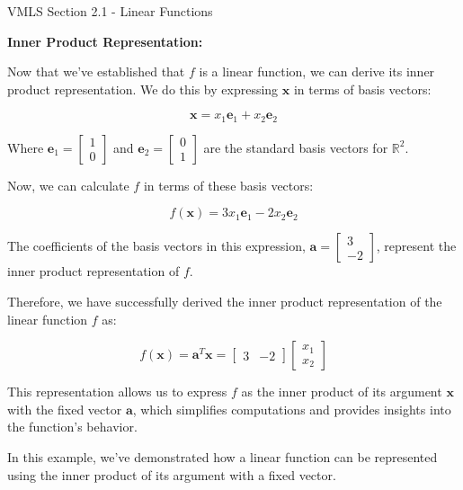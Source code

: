 \begin{notes}{VMLS Section 2.1 - Linear Functions}
\begin{Highlight}
        \vspace*{1em} \textbf{Inner Product Representation:} \vspace*{1em}
        
        Now that we've established that \(f\) is a linear function, we can derive its inner product representation. We do this by expressing \(\mathbf{x}\) in terms of basis vectors:
        
        \[
        \mathbf{x} = x_1\mathbf{e}_1 + x_2\mathbf{e}_2
        \]
        
        Where \(\mathbf{e}_1 = \begin{bmatrix} 1 \\ 0 \end{bmatrix}\) and \(\mathbf{e}_2 = \begin{bmatrix} 0 \\ 1 \end{bmatrix}\) are the standard basis vectors for \(\mathbb{R}^2\).
        
        Now, we can calculate \(f\) in terms of these basis vectors:
        
        \[
        f(\mathbf{x}) = 3x_1\mathbf{e}_1 - 2x_2\mathbf{e}_2
        \]
        
        The coefficients of the basis vectors in this expression, \(\mathbf{a} = \begin{bmatrix} 3 \\ -2 \end{bmatrix}\), represent the inner product representation of \(f\).
        
        Therefore, we have successfully derived the inner product representation of the linear function \(f\) as:
        
        \[
        f(\mathbf{x}) = \mathbf{a}^T \mathbf{x} = \begin{bmatrix} 3 & -2 \end{bmatrix} \begin{bmatrix} x_1 \\ x_2 \end{bmatrix}
        \]

        
        This representation allows us to express \(f\) as the inner product of its argument \(\mathbf{x}\) with the fixed vector \(\mathbf{a}\), which simplifies computations and provides insights into the function's behavior.
        
        In this example, we've demonstrated how a linear function can be represented using the inner product of its argument with a fixed vector.
    \end{Highlight}
    

\end{notes}
